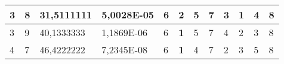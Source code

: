 \documentclass[conference]{IEEEtran}
\begin{document}
\begin{table*}[]
\begin{tabular}{|llll|llllllll|}
\multicolumn{1}{|l|}{3}                                                     & \multicolumn{1}{l|}{8}                                                        & \multicolumn{1}{l|}{31,5111111}                                                   & 5,0028E-05                     & \multicolumn{1}{l|}{6}                                                  & \multicolumn{1}{l|}{2}                                                  & \multicolumn{1}{l|}{5}                                                  & \multicolumn{1}{l|}{7}                                                  & \multicolumn{1}{l|}{3}                                                  & \multicolumn{1}{l|}{\textbf{1}}                                         & \multicolumn{1}{l|}{4}                                                  & 8                          \\ \hline
\multicolumn{1}{|l|}{3}                                                     & \multicolumn{1}{l|}{9}                                                        & \multicolumn{1}{l|}{40,1333333}                                                   & 1,1869E-06                     & \multicolumn{1}{l|}{6}                                                  & \multicolumn{1}{l|}{\textbf{1}}                                         & \multicolumn{1}{l|}{5}                                                  & \multicolumn{1}{l|}{7}                                                  & \multicolumn{1}{l|}{4}                                                  & \multicolumn{1}{l|}{2}                                                  & \multicolumn{1}{l|}{3}                                                  & 8                          \\ \hline
\multicolumn{1}{|l|}{4}                                                     & \multicolumn{1}{l|}{7}                                                        & \multicolumn{1}{l|}{46,4222222}                                                   & 7,2345E-08                     & \multicolumn{1}{l|}{6}                                                  & \multicolumn{1}{l|}{\textbf{1}}                                         & \multicolumn{1}{l|}{4}                                                  & \multicolumn{1}{l|}{7}                                                  & \multicolumn{1}{l|}{2}                                                  & \multicolumn{1}{l|}{3}                                                  & \multicolumn{1}{l|}{5}                                                  & 8                          \\ \hline

\end{tabular}
\end{table*}
\end{document}
